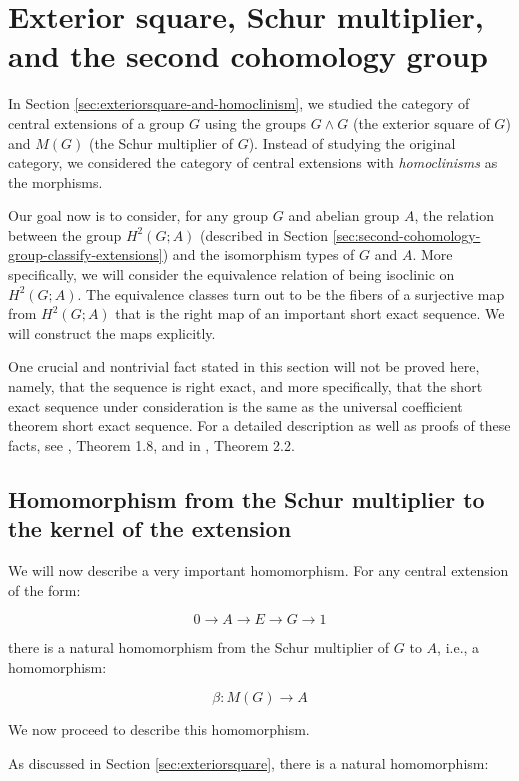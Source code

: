 
\section{Exterior square, Schur multiplier, and the second cohomology group}\label{sec:schur-multiplier-and-second-cohomology}

In Section \ref{sec:exteriorsquare-and-homoclinism}, we studied the
category of central extensions of a group $G$ using the groups $G
\wedge G$ (the exterior square of $G$) and $M(G)$ (the Schur
multiplier of $G$). Instead of studying the original category, we
considered the category of central extensions with {\em homoclinisms}
as the morphisms.

Our goal now is to consider, for any group $G$ and abelian group $A$,
the relation between the group $H^2(G;A)$ (described in Section
\ref{sec:second-cohomology-group-classify-extensions}) and the
isomorphism types of $G$ and $A$. More specifically, we will consider
the equivalence relation of being isoclinic on $H^2(G;A)$. The
equivalence classes turn out to be the fibers of a surjective map from
$H^2(G;A)$ that is the right map of an important short exact
sequence. We will construct the maps explicitly.

One crucial and nontrivial fact stated in this section will not be
proved here, namely, that the sequence is right exact, and more
specifically, that the short exact sequence under consideration is the
same as the universal coefficient theorem short exact sequence. For a
detailed description as well as proofs of these facts, see
\cite{BeylIsoclinisms}, Theorem 1.8, and in
\cite{EckmannHiltonStammbach}, Theorem 2.2.

\subsection{Homomorphism from the Schur multiplier to the kernel of the extension}\label{sec:homschurkernel}

We will now describe a very important homomorphism. For any central extension of the form:

$$0 \to A \to E \to G \to 1$$

there is a natural homomorphism from the Schur multiplier of $G$ to $A$, i.e., a homomorphism:

$$\beta: M(G) \to A$$

We now proceed to describe this homomorphism.

As discussed in Section \ref{sec:exteriorsquare}, there is a natural
homomorphism:

